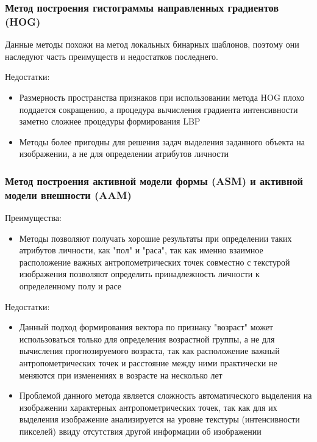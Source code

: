 \documentclass[12pt,a4paper]{article}
\begin{document}
\subsubsection{Метод построения гистограммы направленных градиентов (HOG)}
Данные методы похожи на метод локальных бинарных шаблонов, поэтому они наследуют часть преимуществ и недостатков последнего.

Недостатки:
\begin{itemize}
    \item Размерность пространства признаков при использовании метода HOG плохо поддается сокращению, а процедура вычисления градиента интенсивности заметно сложнее процедуры формирования LBP
    \item Методы более пригодны для решения задач выделения заданного объекта на изображении, а не для определении атрибутов личности
\end{itemize}

\subsubsection{Метод построения активной модели формы (ASM) и активной модели внешности (AAM)}
Преимущества:
\begin{itemize}
    \item Методы позволяют получать хорошие результаты при определении таких атрибутов личности, как "пол" и "раса", так как именно взаимное расположение важных антропометрических точек совместно с текстурой изображения позволяют определить принадлежность личности к определенному полу и расе
\end{itemize}

Недостатки:
\begin{itemize}
    \item Данный подход формирования вектора по признаку "возраст" может использоваться только для определения возрастной группы, а не для вычисления прогнозируемого возраста, так как расположение важный антропометрических точек и расстояние между ними практически не меняются при изменениях в возрасте на несколько лет
    \item Проблемой данного метода является сложность автоматического выделения на изображении характерных антропометрических точек, так как для их выделения изображение анализируется на уровне текстуры (интенсивности пикселей) ввиду отсутствия другой информации об изображении
\end{itemize}
\end{document}
